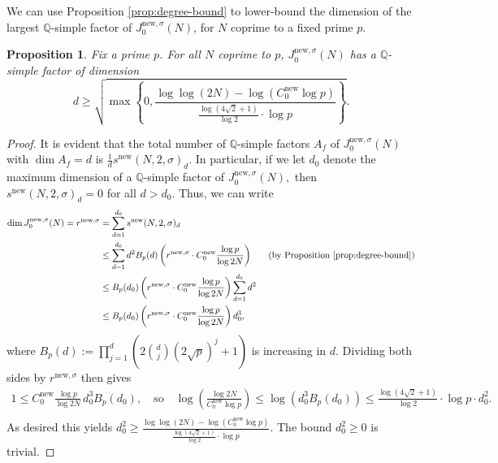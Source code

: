 \documentclass[11pt,letterpaper,reqno]{amsart}
\newtheorem{proposition}[theorem]{Proposition}
\theoremstyle{definition}
\numberwithin{equation}{section}
\numberwithin{figure}{section}
\numberwithin{table}{section}
\newcommand{\QQ}{\mathbb{Q}}
\newcommand{\nw}{\mathrm{new}}
\begin{document}
We can use Proposition \ref{prop:degree-bound} to lower-bound the dimension of the largest $\mathbb{Q}$-simple factor of $J_0^{\nw,\sigma}(N)$, for $N$ coprime to a fixed prime $p$. 


\begin{proposition}\label{prop:lower-bound-dimension-q-simple-factor-new}
Fix a prime $p$. For all $N$ coprime to $p$, $J_0^{\nw, \sigma}(N)$ has a $\mathbb{Q}$-simple factor of dimension $$d \ge \sqrt{ \max \left\{ 0, \frac{\log \log (2N) - \log(C_0^{\nw} \log p)}{\frac{\log (4\sqrt{2} + 1)}{\log 2} \cdot  \log p} \right\}}.$$
\end{proposition}

\begin{proof}
It is evident that the total number of $\QQ$-simple factors $A_f$ of $J_0^{\nw, \sigma}(N)$ with $\dim A_f = d$ is $\frac{1}{d} s^{\nw}(N,2,\sigma)_d$. In particular, if we let $d_0$ denote the maximum dimension of a $\mathbb{Q}$-simple factor of $J_0^{\nw,\sigma}(N),$ then $s^{\nw}(N, 2, \sigma)_d = 0$ for all $d > d_0.$ Thus, we can write
\begin{align*}
    \operatorname{dim } J_0^{\nw,\sigma}(N) =r^{\nw,\sigma} &= \sum_{d = 1}^{d_0} s^{\nw}(N, 2, \sigma)_d\\
    &\leq \sum_{d=1}^{d_0} d^2 B_p(d) \left(  r^{\nw,\sigma} \cdot C_0^{\nw} \frac{\log p}{\log 2N} \right) &\text{ (by Proposition \ref{prop:degree-bound})}\\
    &\leq  B_p(d_0) \left( r^{\nw,\sigma} \cdot C_0^{\nw} \frac{\log p}{\log 2N} \right) \sum_{d=1}^{d_0} d^2\\
    &\leq  B_p(d_0) \left( r^{\nw,\sigma} \cdot C_0^{\nw} \frac{\log p}{\log 2N} \right) d_0^3,
\end{align*}
where $B_p(d) := \prod_{j=1}^{d} \left( 2 \binom{d}{j} \left( 2\sqrt{p} \right)^{j} + 1 \right)$ is increasing in $d$. Dividing both sides by $r^{\nw,\sigma}$ then gives
\begin{align}
    1 \le C_0^{\nw} \frac{\log p}{\log 2N} \, d_0^3 B_p(d_0), \quad \text{so} \quad \log \left( \frac{\log 2N}{C_0^{\nw} \log p} \right) \le \log(d_0^3 B_p(d_0)) \le \frac{\log (4\sqrt{2} + 1)}{\log 2} \cdot \log p \cdot d_0^2. 
    \\
    \label{eqn:temp-log(d^2B(d))-bound-used}
\end{align}
As desired this yields $d_0^2 \ge  \frac{\log \log (2N) - \log(C_0^{\nw} \log p)}{\frac{\log (4\sqrt{2} + 1)}{\log 2} \cdot  \log p}$. The bound $d_0^2 \geq 0$ is trivial.


\end{proof}
\end{document}
